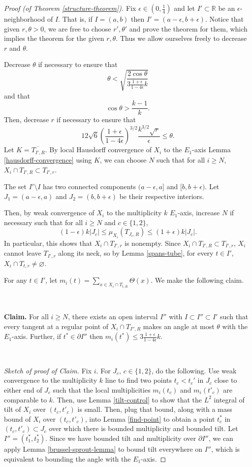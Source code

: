 \documentclass[11pt,reqno,twoside]{amsart}
\theoremstyle{definition}
\begin{document}
\begin{proof}[Proof (of Theorem \ref{structure-theorem})] Fix $\epsilon \in (0,\frac{1}{4})$ and let $I' \subset \mathbb{R}$ be an $\epsilon$-neighborhood of $I$. That is, if $I = (a,b)$ then $I' = (a-\epsilon,b+\epsilon)$. Notice that given $r,\theta > 0$, we are free to choose $r', \theta'$ and prove the theorem for them, which implies the theorem for the given $r,\theta$. Thus we allow ourselves freely to decrease $r$ and $\theta$.

Decrease $\theta$ if necessary to ensure that
\[\theta < \sqrt{\frac{2\cos \theta}{3\frac{1+\epsilon}{1-4\epsilon}k}}\]
and that
\[ \cos \theta > \frac{k-1}{k}. \]
Then, decrease $r$ if necessary to ensure that 
\[12\sqrt{6} \left(\frac{1+\epsilon}{1-4\epsilon}\right)^{3/2}  \frac{k^{3/2}\sqrt{r}}{\epsilon} \leq \theta.\] 
Let $K = \overline{T_{I',R}}$. By local Hausdorff convergence of $X_i$ to the $E_1$-axis Lemma \ref{hausdorff-convergence} using $K$, we can choose $N$ such that for all $i \geq N$, $X_i \cap T_{I',R} \subset T_{I',r}$. 

The set $I' \setminus I$ has two connected components $(a-\epsilon,a]$ and $[b,b+\epsilon)$. Let $J_1 = (a-\epsilon,a)$ and $J_2 = (b,b+\epsilon)$ be their respective interiors. 

Then, by weak convergence of $X_i$ to the multiplicity $k$ $E_1$-axis, increase $N$ if necessary such that for all $i \geq N$ and $c \in \{1,2\}$,
\[(1-\epsilon)k |J_c| \leq \mu_{X_i}(T_{J_c,R}) \leq (1+\epsilon)k |J_c|.\]
In particular, this shows that $X_i \cap T_{I',r}$ is nonempty. Since $X_i \cap T_{I',R} \subset T_{I',r}$, $X_i$ cannot leave $T_{I',r}$ along its neck, so
by Lemma \ref{spans-tube}, for every $t \in I'$, $X_i \cap T_{t,r} \neq \varnothing$.

For any $t \in I'$, let $m_i(t) = \sum_{x \in X_i \cap T_{t,R}} \Theta(x)$. We make the following claim.

\ 

\textbf{Claim.} For all $i \geq N$, there exists an open interval $I''$ with $I \subset I'' \subset I'$ such that every tangent at a regular point of $X_i \cap T_{I'',R}$ makes an angle at most $\theta$ with the $E_1$-axis. Further, if $t^* \in \partial I''$ then
$m_i(t^*) \leq 3\frac{1+\epsilon}{1-4\epsilon} k.$

\

\emph{Sketch of proof of Claim.} Fix $i$. For $J_c$, $c \in \{1,2\}$, do the following. Use weak convergence to the multiplicity $k$ line to find two points $t_c < t_c'$ in $J_c$ close to either end of $J_c$ such that the local multiplicities $m_i(t_c)$ and $m_i(t'_c)$ are comparable to $k$. Then, use Lemma \ref{tilt-control} to show that the $L^2$ integral of tilt of $X_i$ over $(t_c,t'_c)$ is small. Then, plug that bound, along with a mass bound of $X_i$ over $(t_c,t'_c)$, into Lemma \ref{find-point} to obtain a point $t_c^*$ in $(t_c,t'_c) \subset J_c$ over which there is bounded multiplicity and bounded tilt. Let $I'' = (t_1^*,t_2^*).$ Since we have bounded tilt and multiplicity over $\partial I''$, we can apply Lemma \ref{brussel-sprout-lemma} to bound tilt everywhere on $I''$, which is equivalent to bounding the angle with the $E_1$-axis. 


\end{proof}
\end{document}
